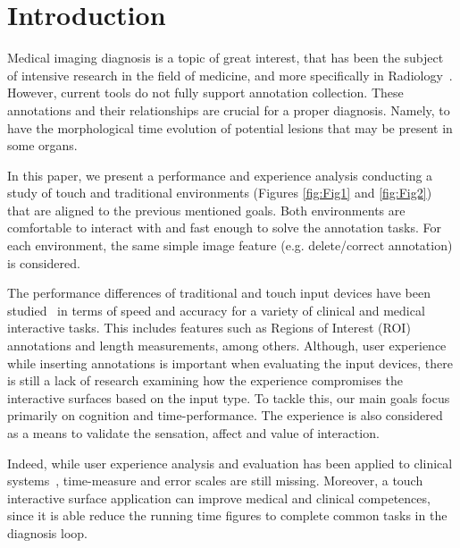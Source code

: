 \documentclass{sigchi}
\begin{document}


\section{Introduction}

Medical imaging diagnosis is a topic of great interest, that has been the subject of intensive research in the field of medicine, and more specifically in Radiology~\cite{doi2007computer, seibel2005medical, doi2005current}. However, current tools do not fully support annotation collection. These annotations and their relationships are crucial for a proper diagnosis. Namely, to have the morphological time evolution of potential lesions that may be present in some organs.

In this paper, we present a performance and experience analysis conducting a study of touch and traditional environments (Figures \ref{fig:Fig1} and \ref{fig:Fig2}) that are aligned to the previous mentioned goals. Both environments are  comfortable to interact with and fast enough to solve the annotation tasks. For each environment, the same simple image feature (e.g. delete/correct annotation) is considered.

The performance differences of traditional and touch input devices have been studied~\cite{watson2013deconstructing} in terms of speed and accuracy for a variety of clinical and medical interactive tasks. This includes features such as Regions of Interest (ROI) annotations and length measurements, among others. Although, user experience while inserting annotations is important when evaluating the input devices, there is still a lack of research examining how the experience compromises the interactive surfaces based on the input type. To tackle this, our main goals focus primarily on cognition and time-performance. The experience is also considered as a means to validate the sensation, affect and value of  interaction.

Indeed, while user experience analysis and evaluation has been applied to clinical systems~\cite{crisan2013optimization},  time-measure and error scales are still missing. Moreover, a touch interactive surface application can improve medical and clinical competences, since it is able reduce the running time figures to complete common tasks in the diagnosis loop.
\end{document}
